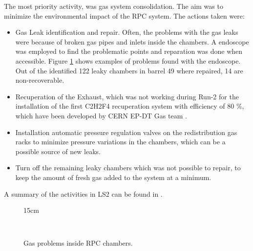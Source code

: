 The most priority activity, was gas system consolidation. The aim was to minimize the environmental impact of the RPC system. The actions taken were:
\begin{itemize}
    \item Gas Leak identification and repair. Often, the problems with the gas leaks were because of broken gas pipes and inlets inside the chambers. A endoscope was employed to find the problematic points and reparation was done when accessible. Figure \ref{fig:gas_problems} shows examples of problems found with the endoscope. Out of the identified 122 leaky chambers in barrel 49 where repaired, 14 are non-recoverable.
    \item Recuperation of the Exhaust, which was not working during Run-2 for the installation of the first C2H2F4 recuperation system with efficiency of 80 \%, which have been developed by CERN EP-DT Gas team \cite{Corbetta:2020esl}.
    \item Installation automatic pressure regulation valves on the redistribution gas racks to minimize pressure variations in the chambers, which can be a possible source of new leaks.
    \item Turn off the remaining leaky chambers which was not possible to repair, to keep the amount of fresh gas added to the system at a minimum.
\end{itemize}
A summary of the activities in LS2 can be found in \cite{Amarilo_2022}.

\begin{figure}[!htm]{15cm}
  \caption{Gas problems inside RPC chambers.} 
  \label{fig:gas_problems}
  \hfill
  \\
\end{figure}

